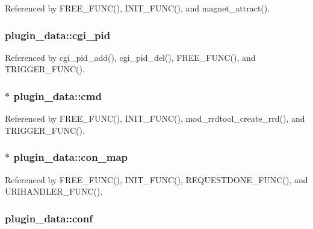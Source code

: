 Referenced by F\-R\-E\-E\-\_\-\-F\-U\-N\-C(), I\-N\-I\-T\-\_\-\-F\-U\-N\-C(), and magnet\-\_\-attract().

\hypertarget{structplugin__data_aeecb5b6d680f1564981751d6908dd8c8}{
\subsubsection[{cgi\-\_\-pid}]{ plugin\-\_\-data\-::cgi\-\_\-pid}}\label{structplugin__data_aeecb5b6d680f1564981751d6908dd8c8}


Referenced by cgi\-\_\-pid\-\_\-add(), cgi\-\_\-pid\-\_\-del(), F\-R\-E\-E\-\_\-\-F\-U\-N\-C(), and T\-R\-I\-G\-G\-E\-R\-\_\-\-F\-U\-N\-C().

\hypertarget{structplugin__data_a7a0de76f783a0cc5507cc8fa32647122}{
\subsubsection[{cmd}]{$\ast$ plugin\-\_\-data\-::cmd}}\label{structplugin__data_a7a0de76f783a0cc5507cc8fa32647122}


Referenced by F\-R\-E\-E\-\_\-\-F\-U\-N\-C(), I\-N\-I\-T\-\_\-\-F\-U\-N\-C(), mod\-\_\-rrdtool\-\_\-create\-\_\-rrd(), and T\-R\-I\-G\-G\-E\-R\-\_\-\-F\-U\-N\-C().

\hypertarget{structplugin__data_a88cadda0c507aae603412d158fc14f35}{
\subsubsection[{con\-\_\-map}]{$\ast$ plugin\-\_\-data\-::con\-\_\-map}}\label{structplugin__data_a88cadda0c507aae603412d158fc14f35}


Referenced by F\-R\-E\-E\-\_\-\-F\-U\-N\-C(), I\-N\-I\-T\-\_\-\-F\-U\-N\-C(), R\-E\-Q\-U\-E\-S\-T\-D\-O\-N\-E\-\_\-\-F\-U\-N\-C(), and U\-R\-I\-H\-A\-N\-D\-L\-E\-R\-\_\-\-F\-U\-N\-C().

\hypertarget{structplugin__data_a9e7cfafb083a07a6d623833a33c6a1dc}{
\subsubsection[{conf}]{ plugin\-\_\-data\-::conf}}\label{structplugin__data_a9e7cfafb083a07a6d623833a33c6a1dc}


